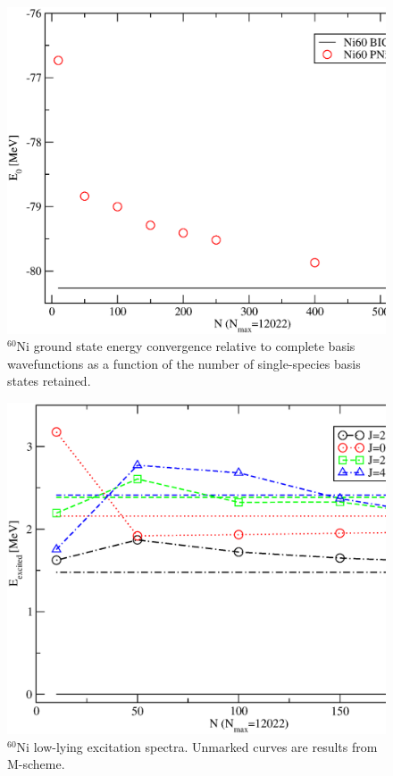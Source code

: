 \begin{figure}
    \centering
    \includegraphics[width=.75\textwidth,clip]{Figures/E0_Ni60}
    \caption{$^{60}$Ni ground state energy convergence relative to complete basis wavefunctions as a function of the number of single-species basis states retained.}
\end{figure}
\begin{figure}
    \centering
    \includegraphics[width=.75\textwidth,clip]{Figures/Ni60}
    \caption{$^{60}$Ni low-lying excitation spectra. Unmarked curves are results from M-scheme.}
\end{figure}






